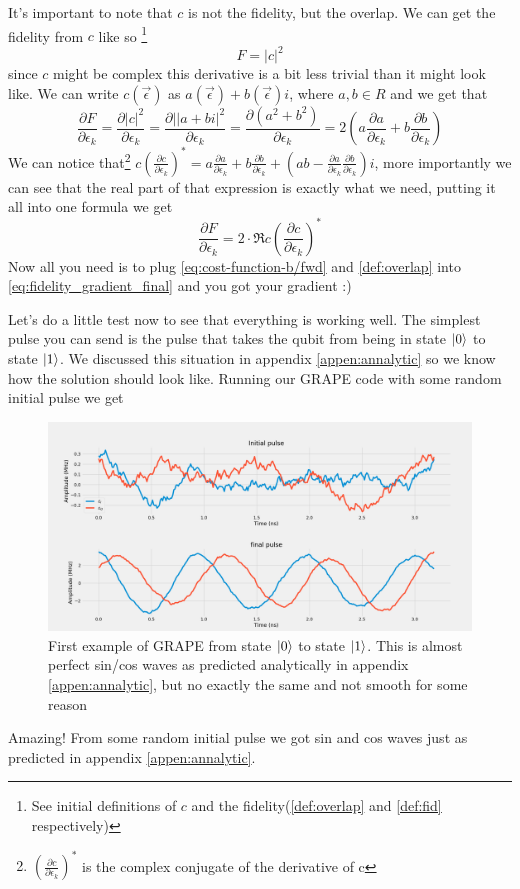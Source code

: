 \documentclass[english, a4paper, 12pt, twoside]{article}
\numberwithin{equation}{section} %
\begin{document}
It's important to note that $c$ is not the fidelity, but the overlap. We can get the fidelity from $c$ like so \footnote{See initial definitions of $c$ and the fidelity(\ref{def:overlap} and \ref{def:fid} respectively)}
\[
F = |c|^2
\]
since $c$ might be complex this derivative is a bit less trivial than it might look like. We can write $c(\vec{\epsilon})$ as $a(\vec{\epsilon}) + b(\vec{\epsilon})i$, where $a, b \in R$ and we get that 
\[
\frac{\partial F}{\partial \epsilon_k} = \frac{\partial |c|^2}{\partial \epsilon_k} = \frac{\partial ||a+bi|^2}{\partial \epsilon_k} = \frac{\partial (a^2 + b^2)}{\partial \epsilon_k} = 2(a\frac{\partial a}{\partial \epsilon_k} + b\frac{\partial b}{\partial \epsilon_k})
\]
We can notice that\footnote{$(\frac{\partial c}{\partial \epsilon_k})^*$ is the complex conjugate of the derivative of c} $c(\frac{\partial c}{\partial \epsilon_k})^* = a\frac{\partial a}{\partial \epsilon_k} + b\frac{\partial b}{\partial \epsilon_k} + (ab - \frac{\partial a}{\partial \epsilon_k}\frac{\partial b}{\partial \epsilon_k})i$, more importantly we can see that the real part of that expression is exactly what we need, putting it all into one formula we get
\begin{equation} \label{eq:fidelity_gradient_final}
    \frac{\partial F}{\partial \epsilon_k} = 2\cdot \Re{c(\frac{\partial c}{\partial \epsilon_k})^*}
\end{equation}
Now all you need is to plug \ref{eq:cost-function-b/fwd} and \ref{def:overlap} into \ref{eq:fidelity_gradient_final} and you got your gradient :)

Let's do a little test now to see that everything is working well. The simplest pulse you can send is the pulse that takes the qubit from being in state $\ket{0}$ to state $\ket{1}$. We discussed this situation in appendix \ref{appen:annalytic} so we know how the solution should look like. Running our GRAPE code with some random initial pulse we get
\begin{figure}[H]
    \centering
    \includegraphics[width=1\columnwidth]{Results/No-Constraints-single-qubit/pulses-pretty2.png}
    \caption{First example of GRAPE from state $\ket{0}$ to state $\ket{1}$. This is almost perfect sin/cos waves as predicted analytically in appendix \ref{appen:annalytic}, but no exactly the same and not smooth for some reason}
    \label{fig:GRAPE-first-example}
\end{figure}
Amazing! From some random initial pulse we got sin and cos waves just as predicted in appendix \ref{appen:annalytic}.
\end{document}
